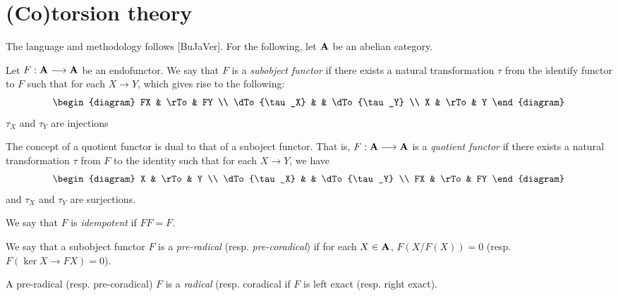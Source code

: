 \section{(Co)torsion theory}

The language and methodology follows [BuJaVer]. For the 
following, let $\mathbf{A}$ be an abelian category.

\begin{definition}
Let $F: \mathbf{A} \longrightarrow \mathbf{A}$ be an endofunctor. We say that
$F$ is a \emph{subobject functor} if there exists a natural 
transformation $\tau$ from the identify functor to $F$
such that for each $X \to Y$, which gives rise to the following:
\[
\begin{diagram}
FX           & \rTo & FY           \\
\dTo{\tau_X} &      & \dTo{\tau_Y} \\
X            & \rTo & Y
\end{diagram}
\]
$\tau_X$ and $\tau_Y$ are injections 
\end{definition}

\begin{definition}
The concept of a quotient functor is dual to that of a suboject
functor. That is, $F: \mathbf{A} \longrightarrow \mathbf{A}$ is a \emph{quotient
functor} if there exists a natural transformation $\tau$ from $F$ 
to the identity such that for each $X \to Y$, we have
\[
\begin{diagram}
X            & \rTo & Y            \\
\dTo{\tau_X} &      & \dTo{\tau_Y} \\
FX           & \rTo & FY
\end{diagram}
\]
and $\tau_X$ and $\tau_Y$ are surjections.
\end{definition}

\begin{definition}
We say that $F$ is \emph{idempotent} if $FF = F$.
\end{definition}

\begin{definition}
We say that a subobject functor $F$ is a \emph{pre-radical} (resp.
\emph{pre-coradical}) if for each $X \in \mathbf{A}$, $F(X/F(X)) = 0$
(resp. $F(\ker X \to FX) = 0$).
\end{definition}

\begin{definition}
A pre-radical (resp. pre-coradical) $F$ is a \emph{radical} (resp. 
coradical if $F$ is left exact (resp. right exact).
\end{definition}

